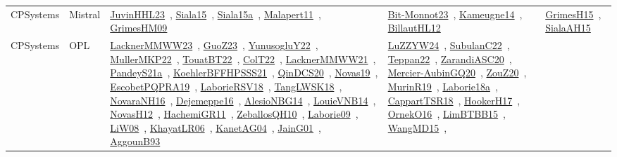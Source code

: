 {\begin{longtable}{lp{3cm}>{\raggedright\arraybackslash}p{6cm}>{\raggedright\arraybackslash}p{6cm}>{\raggedright\arraybackslash}p{8cm}}
CPSystems & Mistral & \href{../works/JuvinHHL23.pdf}{JuvinHHL23}~\cite{JuvinHHL23}, \href{../works/Siala15.pdf}{Siala15}~\cite{Siala15}, \href{../works/Siala15a.pdf}{Siala15a}~\cite{Siala15a}, \href{../works/Malapert11.pdf}{Malapert11}~\cite{Malapert11}, \href{../works/GrimesHM09.pdf}{GrimesHM09}~\cite{GrimesHM09} & \href{../works/Bit-Monnot23.pdf}{Bit-Monnot23}~\cite{Bit-Monnot23}, \href{../works/Kameugne14.pdf}{Kameugne14}~\cite{Kameugne14}, \href{../works/BillautHL12.pdf}{BillautHL12}~\cite{BillautHL12} & \href{../works/GrimesH15.pdf}{GrimesH15}~\cite{GrimesH15}, \href{../works/SialaAH15.pdf}{SialaAH15}~\cite{SialaAH15}\\
CPSystems & OPL & \href{../works/LacknerMMWW23.pdf}{LacknerMMWW23}~\cite{LacknerMMWW23}, \href{../works/GuoZ23.pdf}{GuoZ23}~\cite{GuoZ23}, \href{../works/YunusogluY22.pdf}{YunusogluY22}~\cite{YunusogluY22}, \href{../works/MullerMKP22.pdf}{MullerMKP22}~\cite{MullerMKP22}, \href{../works/TouatBT22.pdf}{TouatBT22}~\cite{TouatBT22}, \href{../works/ColT22.pdf}{ColT22}~\cite{ColT22}, \href{../works/LacknerMMWW21.pdf}{LacknerMMWW21}~\cite{LacknerMMWW21}, \href{../works/PandeyS21a.pdf}{PandeyS21a}~\cite{PandeyS21a}, \href{../works/KoehlerBFFHPSSS21.pdf}{KoehlerBFFHPSSS21}~\cite{KoehlerBFFHPSSS21}, \href{../works/QinDCS20.pdf}{QinDCS20}~\cite{QinDCS20}, \href{../works/Novas19.pdf}{Novas19}~\cite{Novas19}, \href{../works/EscobetPQPRA19.pdf}{EscobetPQPRA19}~\cite{EscobetPQPRA19}, \href{../works/LaborieRSV18.pdf}{LaborieRSV18}~\cite{LaborieRSV18}, \href{../works/TangLWSK18.pdf}{TangLWSK18}~\cite{TangLWSK18}, \href{../works/NovaraNH16.pdf}{NovaraNH16}~\cite{NovaraNH16}, \href{../works/Dejemeppe16.pdf}{Dejemeppe16}~\cite{Dejemeppe16}, \href{../works/AlesioNBG14.pdf}{AlesioNBG14}~\cite{AlesioNBG14}, \href{../works/LouieVNB14.pdf}{LouieVNB14}~\cite{LouieVNB14}, \href{../works/NovasH12.pdf}{NovasH12}~\cite{NovasH12}, \href{../works/HachemiGR11.pdf}{HachemiGR11}~\cite{HachemiGR11}, \href{../works/ZeballosQH10.pdf}{ZeballosQH10}~\cite{ZeballosQH10}, \href{../works/Laborie09.pdf}{Laborie09}~\cite{Laborie09}, \href{../works/LiW08.pdf}{LiW08}~\cite{LiW08}, \href{../works/KhayatLR06.pdf}{KhayatLR06}~\cite{KhayatLR06}, \href{../works/KanetAG04.pdf}{KanetAG04}~\cite{KanetAG04}, \href{../works/JainG01.pdf}{JainG01}~\cite{JainG01}, \href{../works/AggounB93.pdf}{AggounB93}~\cite{AggounB93} & \href{../works/LuZZYW24.pdf}{LuZZYW24}~\cite{LuZZYW24}, \href{../works/SubulanC22.pdf}{SubulanC22}~\cite{SubulanC22}, \href{../works/Teppan22.pdf}{Teppan22}~\cite{Teppan22}, \href{../works/ZarandiASC20.pdf}{ZarandiASC20}~\cite{ZarandiASC20}, \href{../works/Mercier-AubinGQ20.pdf}{Mercier-AubinGQ20}~\cite{Mercier-AubinGQ20}, \href{../works/ZouZ20.pdf}{ZouZ20}~\cite{ZouZ20}, \href{../works/MurinR19.pdf}{MurinR19}~\cite{MurinR19}, \href{../works/Laborie18a.pdf}{Laborie18a}~\cite{Laborie18a}, \href{../works/CappartTSR18.pdf}{CappartTSR18}~\cite{CappartTSR18}, \href{../works/HookerH17.pdf}{HookerH17}~\cite{HookerH17}, \href{../works/OrnekO16.pdf}{OrnekO16}~\cite{OrnekO16}, \href{../works/LimBTBB15.pdf}{LimBTBB15}~\cite{LimBTBB15}, \href{../works/WangMD15.pdf}{WangMD15}~\cite{WangMD15}, 
\end{longtable}}
